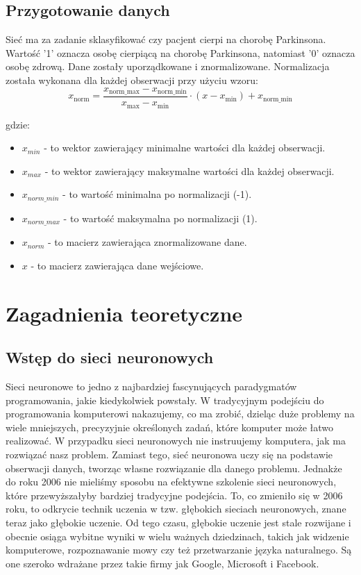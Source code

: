 \documentclass{article}
\begin{document}
\subsection{Przygotowanie danych}
Sieć ma za zadanie sklasyfikować czy pacjent cierpi na chorobę Parkinsona. Wartość '1' oznacza osobę cierpiącą na chorobę Parkinsona, natomiast '0' oznacza osobę zdrową.
Dane zostały uporządkowane i znormalizowane.
Normalizacja została wykonana dla każdej obserwacji przy użyciu wzoru:
\[
    x_{\text{norm}} = \frac{{x_{\text{norm\_max}} - x_{\text{norm\_min}}}}{{x_{\text{max}} - x_{\text{min}}}} \cdot (x - x_{\text{min}}) + x_{\text{norm\_min}}
\]

gdzie:
\begin{itemize}
    \item $x_{min}$ - to wektor zawierający minimalne wartości dla każdej obserwacji.
    \item $x_{max}$ - to wektor zawierający maksymalne wartości dla każdej obserwacji.
    \item $x_{norm\_min}$ - to wartość minimalna po normalizacji (-1).
    \item $x_{norm\_max}$ - to wartość maksymalna po normalizacji (1).
    \item $x_{norm}$ - to macierz zawierająca znormalizowane dane.
    \item $x$ - to macierz zawierająca dane wejściowe.
\end{itemize}
\section{Zagadnienia teoretyczne}
\subsection{Wstęp do sieci neuronowych}

Sieci neuronowe to jedno z najbardziej fascynujących paradygmatów programowania, jakie kiedykolwiek powstały.
W tradycyjnym podejściu do programowania komputerowi nakazujemy, co ma zrobić, dzieląc duże problemy na wiele mniejszych, precyzyjnie określonych zadań, które komputer może łatwo realizować.
W przypadku sieci neuronowych nie instruujemy komputera, jak ma rozwiązać nasz problem.
Zamiast tego, sieć neuronowa uczy się na podstawie obserwacji danych, tworząc własne rozwiązanie dla danego problemu.
Jednakże do roku 2006 nie mieliśmy sposobu na efektywne szkolenie sieci neuronowych, które przewyższałyby bardziej tradycyjne podejścia.
To, co zmieniło się w 2006 roku, to odkrycie technik uczenia w tzw. głębokich sieciach neuronowych, znane teraz jako głębokie uczenie.
Od tego czasu, głębokie uczenie jest stale rozwijane i obecnie osiąga wybitne wyniki w wielu ważnych dziedzinach, takich jak widzenie komputerowe, rozpoznawanie mowy czy też przetwarzanie języka naturalnego.
Są one szeroko wdrażane przez takie firmy jak Google, Microsoft i Facebook.
\end{document}
